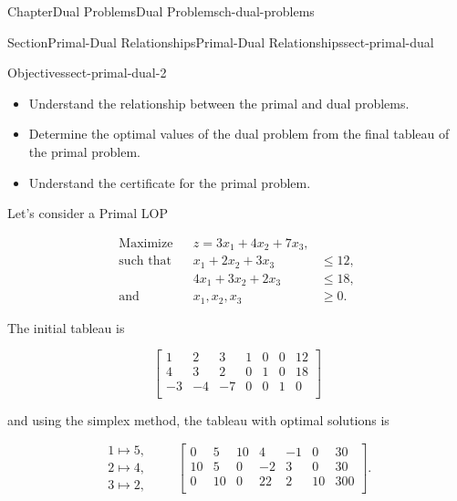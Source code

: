 \documentclass[oneside,10pt,]{book}
\numberwithin{equation}{section}
\newcommand{\amp}{&}
\begin{document}
\begin{chapterptx}{Chapter}{Dual Problems}{}{Dual Problems}{}{}{ch-dual-problems}
\typeout{************************************************}
%
\begin{sectionptx}{Section}{Primal-Dual Relationships}{}{Primal-Dual Relationships}{}{}{sect-primal-dual}
\begin{objectives}{Objectives}{sect-primal-dual-2}
%
\begin{itemize}[label=\textbullet]
\item{}Understand the relationship between the primal and dual problems.%
\item{}Determine the optimal values of the dual problem from the final tableau of the primal problem.%
\item{}Understand the certificate for the primal problem.%
\end{itemize}
\end{objectives}
Let's consider a Primal LOP%
\par
%
\begin{equation*}
\begin{aligned} \text{Maximize} \amp\amp z = 3x_1 + 4x_2 + 7 x_3, \amp  \\ \text{such that}\amp\amp x_1 + 2x_2 + 3x_3 \amp \leq 12, \\ \amp\amp 4x_1 + 3x_2 + 2x_3 \amp  \leq 18, \\ \text{and}\amp\amp x_1, x_2, x_3 \amp \geq 0.
\end{aligned}
\end{equation*}
%
\par
The initial tableau is%
\par
%
\begin{equation*}
\left[\begin{array}{rrr|rrr|r} 1 \amp 2 \amp 3 \amp 1 \amp 0 \amp 0 \amp 12\\ 4 \amp 3 \amp 2 \amp 0 \amp 1 \amp 0 \amp 18\\ \hline -3 \amp -4 \amp -7 \amp 0 \amp 0 \amp 1 \amp 0\\ \end{array} \right]
\end{equation*}
%
\par
and using the simplex method, the tableau with optimal solutions is%
\par
%
\begin{equation*}
\begin{array}{r} 1 \mapsto 5, \\ 2 \mapsto 4, \\ 3 \mapsto 2, \end{array} \qquad \left[\begin{array}{rrr|rrr|r} 0 \amp 5 \amp 10 \amp 4 \amp -1 \amp 0 \amp 30\\ 10 \amp 5 \amp 0 \amp -2 \amp 3 \amp 0 \amp 30\\ \hline 0 \amp 10 \amp 0 \amp 22 \amp 2 \amp 10 \amp 300\\ \end{array} \right].

\end{equation*}
\end{sectionptx}
\end{chapterptx}
\end{document}
